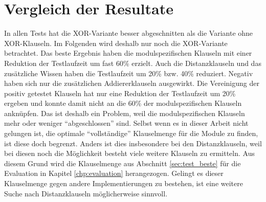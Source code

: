 \section{Vergleich der Resultate}

In allen Tests hat die XOR-Variante besser abgeschnitten als die Variante ohne XOR-Klauseln. Im Folgenden wird deshalb nur noch die XOR-Variante betrachtet.
Das beste Ergebnis haben die modulspezifischen Klauseln mit einer Reduktion der Testlaufzeit um fast 60\% erzielt. Auch die Distanzklauseln und das zusätzliche
Wissen haben die Testlaufzeit um 20\% bzw. 40\% reduziert. Negativ haben sich nur die zusätzlichen Addiererklauseln ausgewirkt. Die Vereinigung der positiv
getestet Klauseln hat nur eine Reduktion der Testlaufzeit um 20\% ergeben und konnte damit nicht an die 60\% der modulspezifischen Klauseln anknüpfen. Das ist
deshalb ein Problem, weil die modulspezifischen Klauseln mehr oder weniger "`abgeschlossen"' sind. Selbst wenn es in dieser Arbeit nicht gelungen ist, die
optimale "`vollständige"' Klauselmenge für die Module zu finden, ist diese doch begrenzt. Anders ist dies insbesondere bei den Distanzklauseln, weil bei diesen
noch die Möglichkeit besteht viele weitere Klauseln zu ermitteln. Aus diesem Grund wird die Klauselmenge aus Abschnitt \ref{sec:test_beste} für die Evaluation
in Kapitel \ref{chp:evaluation} herangezogen. Gelingt es dieser Klauselmenge gegen andere Implementierungen zu bestehen, ist eine weitere Suche nach
Distanzklauseln möglicherweise sinnvoll.
